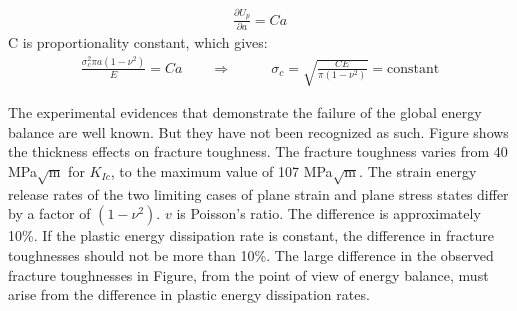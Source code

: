 \documentclass[12pt]{article}
\begin{document}
\begin{align*}
    \frac{\partial U_p}{\partial a} = Ca
\end{align*}
C is proportionality constant, which gives:
\begin{align}
    \frac{\sigma_{c}^{2} \pi a (1 - \nu ^ 2)}{E} = Ca \qquad
\Rightarrow \qquad &\sigma_c = \sqrt{\frac{CE}{\pi (1 - \nu ^ 2)}} = \text{constant} \nonumber
\end{align}

The experimental evidences that demonstrate the failure of the global energy balance are well known.
But they have not been recognized as such. Figure shows the thickness effects on fracture toughness.
The fracture toughness varies from 40 MPa$\sqrt{\text{m}}$ for $K_{Ic}$, to the maximum value of 107 MPa$\sqrt{\text{m}}$. The
strain energy release rates of the two limiting cases of plane strain and plane stress states differ by a
factor of $(1 - \nu ^ 2)$. $v$ is Poisson’s ratio. The difference is approximately 10\%. If the plastic energy
dissipation rate is constant, the difference in fracture toughnesses should not be more than 10\%. The
large difference in the observed fracture toughnesses in Figure, from the point of view of energy balance,
must arise from the difference in plastic energy dissipation rates.
\end{document}
